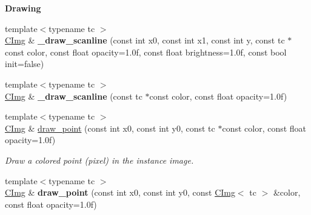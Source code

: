 \begin{Indent}{\bf Drawing}\par
\begin{DoxyCompactItemize}
\item 
\hypertarget{structcimg__library_1_1_c_img_a3e669f0da96691accc25048b9a75c420}{{\footnotesize template$<$typename tc $>$ }\\\hyperlink{structcimg__library_1_1_c_img}{C\-Img} \& {\bfseries \-\_\-draw\-\_\-scanline} (const int x0, const int x1, const int y, const tc $\ast$const color, const float opacity=1.\-0f, const float brightness=1.\-0f, const bool init=false)}\label{structcimg__library_1_1_c_img_a3e669f0da96691accc25048b9a75c420}

\item 
\hypertarget{structcimg__library_1_1_c_img_aa9396a66d2ba5ca85e064a0837f03c26}{{\footnotesize template$<$typename tc $>$ }\\\hyperlink{structcimg__library_1_1_c_img}{C\-Img} \& {\bfseries \-\_\-draw\-\_\-scanline} (const tc $\ast$const color, const float opacity=1.\-0f)}\label{structcimg__library_1_1_c_img_aa9396a66d2ba5ca85e064a0837f03c26}

\item 
{\footnotesize template$<$typename tc $>$ }\\\hyperlink{structcimg__library_1_1_c_img}{C\-Img} \& \hyperlink{structcimg__library_1_1_c_img_a752ba1edbc0912be6454062f207c4ecd}{draw\-\_\-point} (const int x0, const int y0, const tc $\ast$const color, const float opacity=1.\-0f)
\begin{DoxyCompactList}\small\item\em Draw a colored point (pixel) in the instance image. \end{DoxyCompactList}\item 
\hypertarget{structcimg__library_1_1_c_img_a9f1edf7e30ec04a30ad08ef21e6afb5f}{{\footnotesize template$<$typename tc $>$ }\\\hyperlink{structcimg__library_1_1_c_img}{C\-Img} \& {\bfseries draw\-\_\-point} (const int x0, const int y0, const \hyperlink{structcimg__library_1_1_c_img}{C\-Img}$<$ tc $>$ \&color, const float opacity=1.\-0f)}\label{structcimg__library_1_1_c_img_a9f1edf7e30ec04a30ad08ef21e6afb5f}


\end{DoxyCompactItemize}
\end{Indent}
